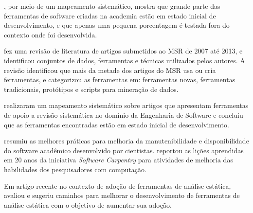 , por meio de
um mapeamento sistemático, mostra que grande parte das ferramentas de
software criadas na academia estão em estado inicial de desenvolvimento, e que
apenas uma pequena porcentagem é testada fora do contexto onde foi
desenvolvida. 

fez uma revisão de literatura de artigos submetidos ao MSR de 2007 até 2013,
e identificou conjuntos de dados, ferramentas e técnicas utilizados pelos autores.
A revisão identificou que mais da metade dos artigos do MSR usa ou cria ferramentas,
e categorizou as ferramentas em:
ferramentas novas, ferramentas tradicionais, protótipos e scripts para
mineração de dados.

 realizaram um mapeamento sistemático sobre 
artigos que apresentam ferramentas de apoio a revisão sistemática no domínio da
Engenharia de Software
e concluiu que as
ferramentas encontradas estão em estado inicial de desenvolvimento.

 resumiu as melhores práticas para melhoria da
manutenibilidade e disponibilidade do software acadêmico desenvolvido por
cientistas.
 reportou
as lições aprendidas em 20 anos da iniciativa {\it Software Carpentry} 
para atividades de melhoria das
habilidades dos pesquisadores com computação.

Em artigo recente no contexto de adoção de ferramentas de análise estática,
 avaliou e sugeriu caminhos 
para melhorar o desenvolvimento de ferramentas de análise estática 
com o objetivo de aumentar sua adoção.




%

